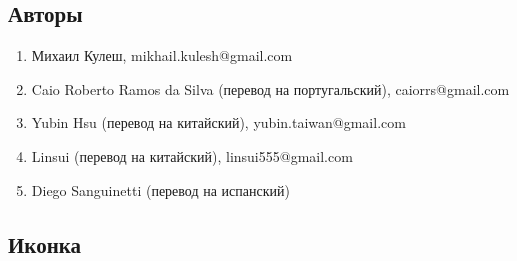 \documentclass[DIV=calc, paper=a4, fontsize=11pt, twocolumn]{scrartcl}
\begin{document}
\subsection{Авторы}

\begin{enumerate}
\item Михаил Кулеш,
mikhail.kulesh@gmail.com

\item Caio Roberto Ramos da Silva
(перевод на португальский),
caiorrs@gmail.com

\item Yubin Hsu
(перевод на китайский),
yubin.taiwan@gmail.com

\item Linsui
(перевод на китайский),
linsui555@gmail.com

\item Diego Sanguinetti
(перевод на испанский)
\end{enumerate}

\subsection{Иконка}
\end{document}
